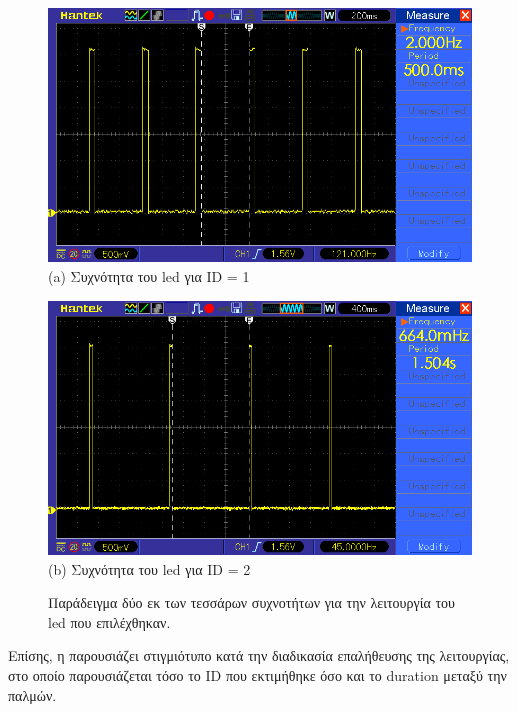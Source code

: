 \begin{figure} [H]
	\centering
    \begin{minipage}{.5\textwidth}
      \centering
      \includegraphics[width=0.9\linewidth]{../Images/Experiments-Results/node-pulses-0_5sec.png}\\
      {(a) Συχνότητα του led για ID = 1}
    \end{minipage}%
    \begin{minipage}{.5\textwidth}
      \centering
      \includegraphics[width=.9\linewidth]{../Images/Experiments-Results/node_pulses_1_5sec.png}\\
      {(b) Συχνότητα του led για ID = 2}
	  \end{minipage}
    \hfill \break
    \decoRule
    \caption[Παράδειγμα δύο εκ των τεσσάρων συχνοτήτων για την λειτουργία του led που επιλέχθηκαν.]{Παράδειγμα δύο εκ των τεσσάρων συχνοτήτων για την λειτουργία του led που επιλέχθηκαν.}%
    \label{fig:id-osci-samples}
\end{figure}

Επίσης, η  παρουσιάζει στιγμιότυπο κατά την διαδικασία επαλήθευσης της λειτουργίας, στο οποίο παρουσιάζεται τόσο το ID που εκτιμήθηκε όσο και το duration μεταξύ την παλμών.


